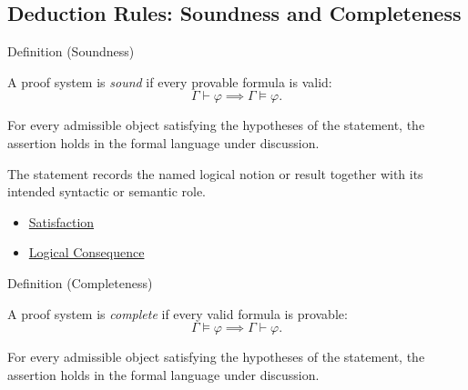 
\subsection{Deduction Rules: Soundness and Completeness}


\begin{definitionbox}{Definition (Soundness)}
\begin{definition}[Soundness]\label{def:fol-soundness}
A proof system is \emph{sound} if every provable formula is valid:
\[
\Gamma \vdash \varphi \implies \Gamma \models \varphi.
\]
\end{definition}
\end{definitionbox}
\begin{remark*}
For every admissible object satisfying the hypotheses of the statement, the
assertion holds in the formal language under discussion.
\end{remark*}

\begin{remark*}[Interpretation]
The statement records the named logical notion or result together with its
intended syntactic or semantic role.
\end{remark*}

\begin{dependencies}
\begin{itemize}
  \item \hyperref[def:fol-satisfaction]{Satisfaction}
  \item \hyperref[def:log-consequence]{Logical Consequence}
\end{itemize}
\end{dependencies}

\begin{definitionbox}{Definition (Completeness)}
\begin{definition}[Completeness]\label{def:fol-completeness}
A proof system is \emph{complete} if every valid formula is provable:
\[
\Gamma \models \varphi \implies \Gamma \vdash \varphi.
\]
\end{definition}
\end{definitionbox}
\begin{remark*}
For every admissible object satisfying the hypotheses of the statement, the
assertion holds in the formal language under discussion.
\end{remark*}

